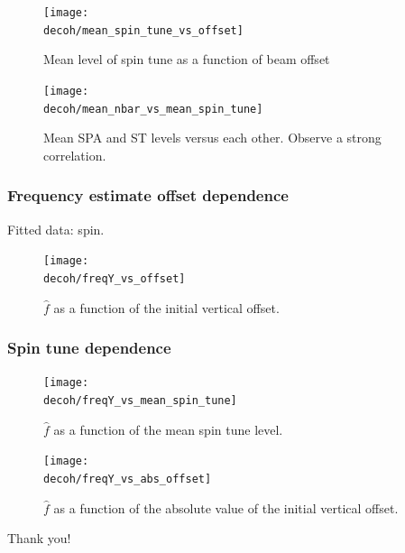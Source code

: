 \documentclass{beamer}
\newcommand{\home}{\string~}
\newcommand{\Artem}{\home/REPOS/COSYINF/img/Artem}
\newcommand{\decoh}{\Artem/decoherence_frequency_dependence}
\begin{document}
\begin{frame}
  \begin{figure}[H]
    \centering
    \texttt{[image: \\decoh/mean\_spin\_tune\_vs\_offset]}
    \caption{Mean level of spin tune as a function of beam offset}
  \end{figure}
\end{frame}

\begin{frame}
  \begin{figure}[H]
    \texttt{[image: \\decoh/mean\_nbar\_vs\_mean\_spin\_tune]}
    \caption{Mean SPA and ST levels versus each other. Observe a strong correlation.\label{fig:mean_tune_axis}}
  \end{figure}
\end{frame}

\begin{frame}\frametitle{Frequency estimate offset dependence}
  Fitted data: spin.
  \begin{figure}[H]
    \centering
    \texttt{[image: \\decoh/freqY\_vs\_offset]}
    \caption{$\hat f$ as a function of the initial vertical offset.}
  \end{figure}
\end{frame}

\begin{frame}\frametitle{Spin tune dependence}
  \begin{figure}[H]
    \texttt{[image: \\decoh/freqY\_vs\_mean\_spin\_tune]}
    \caption{$\hat f$ as a function of the mean spin tune level.}
  \end{figure}
\end{frame}

\begin{frame}
  \begin{figure}[H]
    \texttt{[image: \\decoh/freqY\_vs\_abs\_offset]}
    \caption{$\hat f$ as a function of the absolute value of the initial vertical offset.}
  \end{figure}
\end{frame}

\begin{frame}
  \begin{center}
    Thank you!
  \end{center}
\end{frame}
\end{document}
